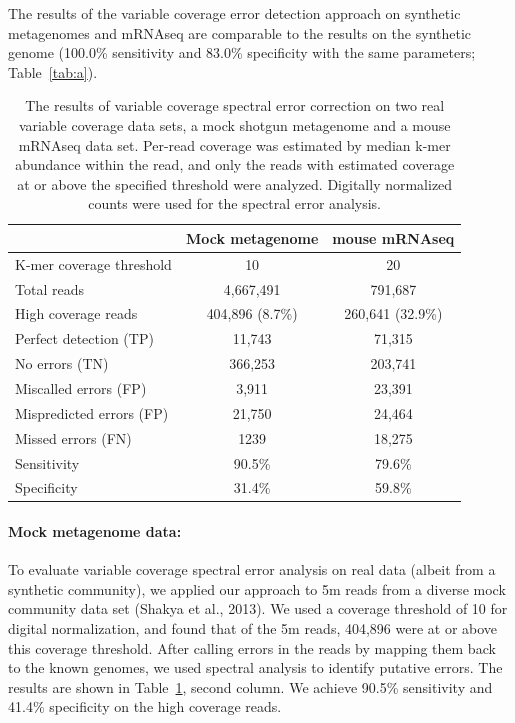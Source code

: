 \documentclass{article}
\begin{document}
The results of the variable coverage error detection approach on
synthetic metagenomes and mRNAseq are comparable to the results
on the synthetic genome (100.0\% sensitivity and 83.0\%
specificity with the same parameters; Table~\ref{tab:a}).


\begin{table}
\begin{tabular}{|l|c||c|}
\hline
& Mock metagenome & mouse mRNAseq \\
\hline
K-mer coverage threshold   & 10              & 20 \\
Total reads                & 4,667,491       & 791,687 \\
High coverage reads        & 404,896 (8.7\%) & 260,641 (32.9\%) \\
\hline
Perfect detection (TP)     & 11,743          & 71,315 \\
No errors (TN)             & 366,253         & 203,741 \\
Miscalled errors (FP)      & 3,911           & 23,391 \\
Mispredicted errors (FP)   & 21,750          & 24,464 \\
Missed errors (FN)         & 1239            & 18,275 \\
\hline
Sensitivity & 90.5\% & 79.6\% \\
Specificity & 31.4\% & 59.8\% \\
\hline
\end{tabular}
\label{tab:spectra_variable_real}

\caption{The results of variable coverage spectral error correction on
  two real variable coverage data sets, a mock shotgun metagenome and
  a mouse mRNAseq data set. Per-read coverage was estimated by median
  k-mer abundance within the read, and only the reads with estimated
  coverage at or above the specified threshold were analyzed.
  Digitally normalized counts were used for the spectral error analysis.}

\end{table}

\paragraph{Mock metagenome data:}


To evaluate variable coverage spectral error analysis on real data
(albeit from a synthetic community), we applied our approach to 5m
reads from a diverse mock community data set (Shakya et al., 2013). We
used a coverage threshold of 10 for digital normalization, and found
that of the 5m reads, 404,896 were at or above this coverage
threshold.  After calling errors in the reads by mapping them back to
the known genomes, we used spectral analysis to identify putative
errors.  The results are shown in
Table~\ref{tab:spectra_variable_real}, second column.  We achieve
90.5\% sensitivity and 41.4\% specificity on the high coverage reads.
\end{document}
